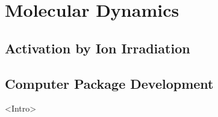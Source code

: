 \chapter{Molecular Dynamics}

\begin{changemargin}{1.0cm}{1.0cm} 
\end{changemargin}

\section{Activation by Ion Irradiation}

\section{Computer Package Development}
 
<Intro>







